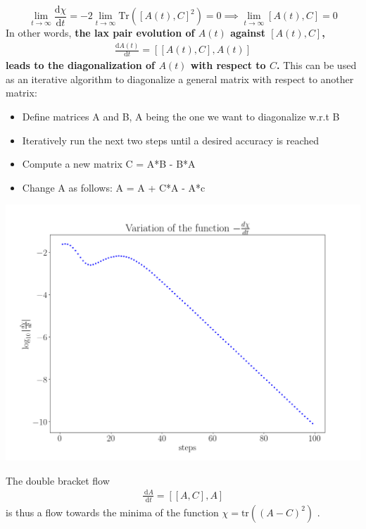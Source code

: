 \documentclass[12pt,twoside]{article}
\numberwithin{equation}{section}
\begin{document}
{\begin{equation}
	\lim_{t\to \infty}\frac{\mathrm{d} \chi}{\mathrm{d}t} = -2 \lim_{t\to \infty}\text{Tr}\left(\left[A(t), C\right]^2\right) = 0 \implies \lim_{t\to \infty}\left[A(t), C\right] = 0
\end{equation}
In other words, \textbf{the lax pair evolution of \(A(t)\) against \(\left[A(t),C\right]\),
\begin{equation}\begin{aligned}
	\label{dbflow}
	\frac{\mathrm{d}A(t)}{\mathrm{d}t} = \left[\left[A(t),C\right], A(t)\right]
\end{aligned}\end{equation}
leads to the diagonalization of \(A(t)\) with respect to \(C\).} This can be used as an iterative algorithm to diagonalize a general matrix with respect to another matrix:
\begin{itemize}
	\item Define matrices A and B, A being the one we want to diagonalize w.r.t B
	\item Iteratively run the next two steps until a desired accuracy is reached
	\item Compute a new matrix C = A*B - B*A
	\item Change A as follows: A = A + C*A - A*c
\end{itemize}
\begin{center}
	\includegraphics[scale=0.37]{../figures/Svsi.png}
\end{center}
The double bracket flow
\begin{equation}\begin{aligned}
	\frac{\:\mathrm{d}A}{\:\mathrm{d}t} = \left[  \left[ A, C \right], A  \right] 
\end{aligned}\end{equation}
is thus a flow towards the minima of the function \( \chi = \text{tr}\left( \left( A - C \right) ^2 \right)  \) .
}
\end{document}
